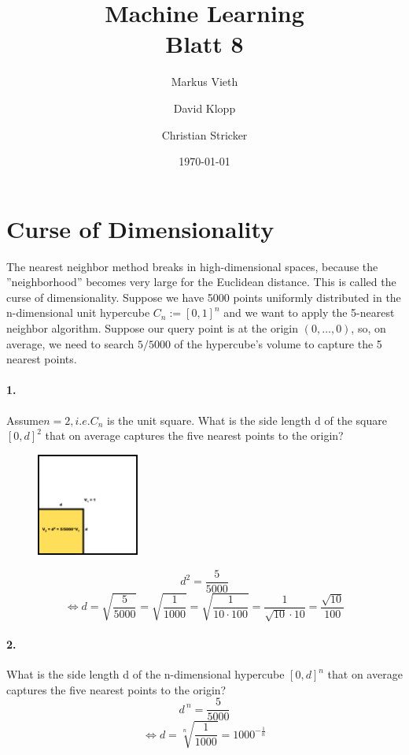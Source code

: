 \documentclass[a4paper,11pt,twoside]{scrartcl}
\title{Machine Learning\\ Blatt 8}
\author{Markus Vieth\and David Klopp\and Christian Stricker}
\date{\today}
\begin{document}
\newcommand{\cor}[1]{\textcolor{red}{\textit{#1}}}
\maketitle
\cleardoublepage
\pagestyle{myheadings}

\section*{Curse of Dimensionality}

The nearest neighbor method breaks in high-dimensional spaces, because the ''neighborhood'' becomes very large for the Euclidean distance. This is called the curse of dimensionality. Suppose  we have 5000 points uniformly distributed in the n-dimensional unit hypercube $C_n := [0,1]^n$ and we want to apply the 5-nearest neighbor algorithm. Suppose our query point is at the origin $(0, \ldots, 0)$, so, on average, we need to search $5/5000$ of the hypercube's volume to capture the 5 nearest points.

\paragraph*{1.} Assume$ n=2, i.e. C_n$ is the unit square. What is the side length d of the square $[0,d]^2$ that on average captures the five nearest points to the origin?

\begin{figure}[H]
\center
\includegraphics[width=0.3\textwidth]{images/1_1.pdf}
\end{figure}

\[d^2 = \frac{5}{5000} \]
\[\Leftrightarrow d = \sqrt{\frac{5}{5000}} = \sqrt{\frac{1}{1000}} = \sqrt{\frac{1}{10 \cdot 100}} = {\frac{1}{\sqrt{10} \cdot 10}} = {\frac{\sqrt{10}}{100}}\]

\paragraph*{2.} What is the side length d of the n-dimensional hypercube $[0,d]^n$ that on average captures the five nearest points to the origin?
\[d^{\:n} = \frac{5}{5000} \]
\[\Leftrightarrow d = \sqrt[n]{\frac{1}{1000}} = 1000^{-\frac{1}{n}}\]
\end{document}
